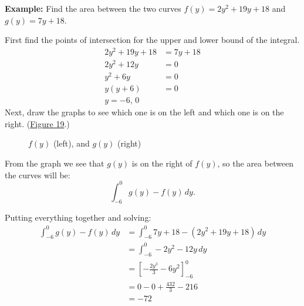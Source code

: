 \documentclass[12pt]{article}
\begin{document}
\noindent \textbf{Example:} Find the area between the two curves $f(y)=2y^2 + 19y + 18$ and $g(y)=7y + 18$.

\noindent First find the points of intersection for the upper and lower bound of the integral.
\begin{align*}
    2y^2 + 19y + 18 & = 7y + 18 \\
    2y^2 + 12y      & = 0       \\
    y^2 + 6y        & = 0       \\
    y(y+6)          & = 0       \\
    y = -6, \, 0
\end{align*}
Next, draw the graphs to see which one is on the left and which one is on the right. (\hyperref[fig:abcy1]{Figure 19}.)

\begin{figure}[H]
    \begin{center}
        \caption{$f(y)$ (left), and $g(y)$ (right)}
        \label{fig:abcy1}
    \end{center}
\end{figure}

From the graph we see that $g(y)$ is on the right of $f(y)$, so the area between the curves will be:
\[ \int_{-6}^0 g(y) - f(y) \, dy. \]

\noindent Putting everything together and solving:
\begin{align*}
    \int_{-6}^0 g(y) - f(y) \, dy & = \int_{-6}^0 7y + 18 - (2y^2 + 19y + 18) \, dy \\
                                  & = \int_{-6}^0 -2y^2 - 12y \, dy                 \\
                                  & = \left[ -\frac{2y^3}{3} - 6y^2 \right]_{-6}^0  \\[6pt]
                                  & = 0 - 0 + \frac{432}{3} - 216                   \\[6pt]
                                  & = -72
\end{align*}
\end{document}
